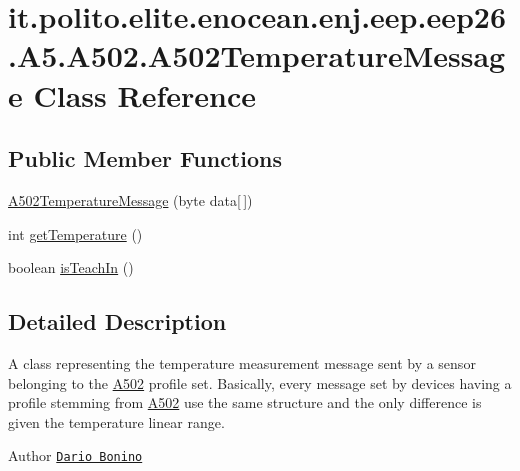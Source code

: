 \hypertarget{classit_1_1polito_1_1elite_1_1enocean_1_1enj_1_1eep_1_1eep26_1_1_a5_1_1_a502_1_1_a502_temperature_message}{}\section{it.\+polito.\+elite.\+enocean.\+enj.\+eep.\+eep26.\+A5.\+A502.\+A502\+Temperature\+Message Class Reference}
\label{classit_1_1polito_1_1elite_1_1enocean_1_1enj_1_1eep_1_1eep26_1_1_a5_1_1_a502_1_1_a502_temperature_message}
\subsection*{Public Member Functions}
\begin{DoxyCompactItemize}
\item 
\hyperlink{classit_1_1polito_1_1elite_1_1enocean_1_1enj_1_1eep_1_1eep26_1_1_a5_1_1_a502_1_1_a502_temperature_message_a9f112535bf2391f99f69d779b9cd3ba9}{A502\+Temperature\+Message} (byte data\mbox{[}$\,$\mbox{]})
\item 
int \hyperlink{classit_1_1polito_1_1elite_1_1enocean_1_1enj_1_1eep_1_1eep26_1_1_a5_1_1_a502_1_1_a502_temperature_message_ad7c54d556468cafe5b86ea1b6e48160a}{get\+Temperature} ()
\item 
boolean \hyperlink{classit_1_1polito_1_1elite_1_1enocean_1_1enj_1_1eep_1_1eep26_1_1_a5_1_1_a502_1_1_a502_temperature_message_a5f81f72aeaf4cd6673f4ed3b52d21db6}{is\+Teach\+In} ()
\end{DoxyCompactItemize}


\subsection{Detailed Description}
A class representing the temperature measurement message sent by a sensor belonging to the \hyperlink{classit_1_1polito_1_1elite_1_1enocean_1_1enj_1_1eep_1_1eep26_1_1_a5_1_1_a502_1_1_a502}{A502} profile set. Basically, every message set by devices having a profile stemming from \hyperlink{classit_1_1polito_1_1elite_1_1enocean_1_1enj_1_1eep_1_1eep26_1_1_a5_1_1_a502_1_1_a502}{A502} use the same structure and the only difference is given the temperature linear range.

\begin{DoxyAuthor}{Author}
\href{mailto:dario.bonino@gmail.com}{\tt Dario Bonino} 
\end{DoxyAuthor}


